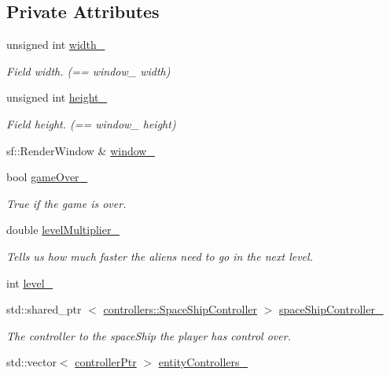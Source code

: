 \subsection*{\-Private \-Attributes}
\begin{DoxyCompactItemize}
\item 
unsigned int \hyperlink{classmodels_1_1Game_a2d35c6907ba8c23ff04437ed5ba43600}{width\-\_\-}
\begin{DoxyCompactList}\small\item\em \-Field width. (== window\-\_\- width) \end{DoxyCompactList}\item 
unsigned int \hyperlink{classmodels_1_1Game_a3f90aed51cc96528ec30c06c140f62be}{height\-\_\-}
\begin{DoxyCompactList}\small\item\em \-Field height. (== window\-\_\- height) \end{DoxyCompactList}\item 
sf\-::\-Render\-Window \& \hyperlink{classmodels_1_1Game_a6060ca52bfe25a1c0c6f9938ed7392c1}{window\-\_\-}
\item 
bool \hyperlink{classmodels_1_1Game_affccbd7e23754678c146a35bc5bad15e}{game\-Over\-\_\-}
\begin{DoxyCompactList}\small\item\em \-True if the game is over. \end{DoxyCompactList}\item 
double \hyperlink{classmodels_1_1Game_a7d27674020645d1e5e2babfcf09cd6af}{level\-Multiplier\-\_\-}
\begin{DoxyCompactList}\small\item\em \-Tells us how much faster the aliens need to go in the next level. \end{DoxyCompactList}\item 
int \hyperlink{classmodels_1_1Game_a874b7370f21b44afa1e4aa30cfa84e1a}{level\-\_\-}
\item 
std\-::shared\-\_\-ptr\*
$<$ \hyperlink{classcontrollers_1_1SpaceShipController}{controllers\-::\-Space\-Ship\-Controller} $>$ \hyperlink{classmodels_1_1Game_a73891e3039540572f4117da47cb20723}{space\-Ship\-Controller\-\_\-}
\begin{DoxyCompactList}\small\item\em \-The controller to the space\-Ship the player has control over. \end{DoxyCompactList}\item 
std\-::vector$<$ \hyperlink{Game_8h_a21b04f6cf2d5990b82725fac5ea2ce9a}{controller\-Ptr} $>$ \hyperlink{classmodels_1_1Game_a46a3c85ae7b12a4189b3a62c02a7e860}{entity\-Controllers\-\_\-}

\end{DoxyCompactItemize}
